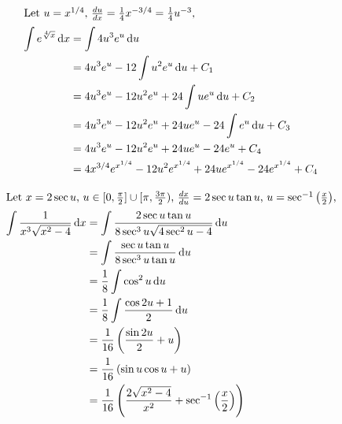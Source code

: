 \documentclass[12pt]{article}
\newcommand*\diff{\mathop{}\!\mathrm{d}}
\newenvironment{problem}[2][Problem]{\begin{trivlist}
\item[\hskip \labelsep {\bfseries #1}\hskip \labelsep {\bfseries #2.}]}{\end{trivlist}}
\begin{document}
\begin{problem}{2.a}
\end{problem}
\begin{align*}
\intertext{Let $u = x^{1/4}$, $\frac{du}{dx} = \frac{1}{4}x^{-3/4} = \frac{1}{4}u^{-3}$,}
\int e^{\sqrt[4]{x}} \diff x &= \int 4 u^3 e^u \diff u\\
&= 4 u^3 e^u - 12\int u^2 e^u \diff u + C_1\\
&= 4 u^3 e^u - 12 u^2 e^u + 24\int u e^u \diff u + C_2\\
&= 4 u^3 e^u - 12 u^2 e^u + 24u e^u - 24\int e^u \diff u + C_3\\
&= 4 u^3 e^u - 12 u^2 e^u + 24u e^u - 24e^u + C_4\\
&= 4 x^{3/4} e^{x^{1/4}} - 12 u^2 e^{x^{1/4}} + 24u e^{x^{1/4}} - 24e^{x^{1/4}}  + C_4\\
\end{align*}
\filbreak

\begin{problem}{2.b}
\end{problem}
\begin{align*}
\intertext{Let $x = 2\sec u$, $u \in [0,\frac{\pi}{2}] \cup [\pi, \frac{3\pi}{2})$, $\frac{dx}{du} = 2\sec u\tan u$, $u = \sec^{-1}\left(\frac{x}{2}\right)$,}
\int
	\frac{
		1
	}
	{
		x^3 \sqrt{x^2-4}
	}
\diff x
&=
\int
	\frac{
		2\sec u\tan u
	}
	{
		8\sec^3 u \sqrt{4\sec^2 u - 4}
	}
\diff u\\
&=
\int
	\frac{
		\sec u\tan u
	}
	{
		8\sec^3 u \tan u
	}
\diff u\\
&=
\frac{1}{8}
\int
	\cos^2 u
\diff u\\
&=
\frac{1}{8}
\int
	\frac{
		\cos 2u + 1
	}
	{
		2
	}
\diff u\\
&=
\frac{1}{16} 
\left(
\frac{\sin 2u}{2} + u
\right)
\\
&=
\frac{1}{16} 
\left(
\sin u \cos u + u
\right)
\\
&=
\frac{1}{16} 
\left(
\frac{2\sqrt{x^2-4}}{x^2} + \sec^{-1}\left(\frac{x}{2}\right)
\right)
\\
\end{align*}
\filbreak
\end{document}
